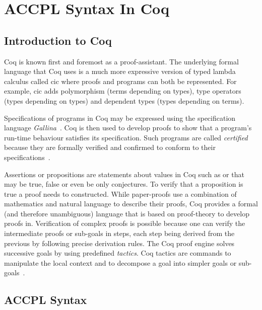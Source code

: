 \chapter{ACCPL Syntax In Coq}\label{chap:odrl0syntaxcoq}

\section{Introduction to Coq}

Coq is known first and foremost as a proof-assistant. The underlying formal language that Coq uses is a much more expressive version of typed lambda calculus called \ac{cic} where proofs and programs can both be represented. For example, \ac{cic} adds polymorphism (terms depending on types), type operators (types depending on types) and dependent types (types depending on terms).

Specifications of programs in Coq may be expressed using the specification language \emph{Gallina}~\cite{gallinaref}. Coq is then used to develop proofs to show that a program's run-time behaviour satisfies its specification. Such programs are called \emph{certified} because they are formally verified and confirmed to conform to their specifications~\cite{BC04}.

Assertions or propositions are statements about values in Coq such as  or  that may be true, false or even be only conjectures. To verify that a proposition is true a proof needs to constructed. While paper-proofs use a combination of mathematics and natural language to describe their proofs, Coq provides a formal (and therefore unambiguous) language that is based on proof-theory to develop proofs in. Verification of complex proofs is possible because one can verify the intermediate proofs or sub-goals in steps, each step being derived from the previous by following precise derivation rules. The Coq proof engine solves successive goals by using predefined \emph{tactics}. Coq tactics are commands to manipulate the local context and to decompose a goal into simpler goals or sub-goals~\cite{BC04}.

\section{ACCPL Syntax}\label{sec:agreementConstructor}


